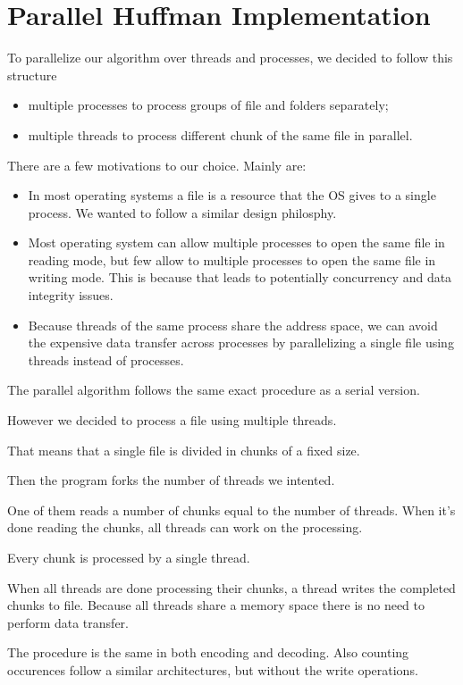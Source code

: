 \section{Parallel Huffman Implementation}
To parallelize our algorithm over threads and processes, we decided to follow this structure
\begin{itemize}
    \item multiple processes to process groups of file and folders separately;
    \item multiple threads to process different chunk of the same file in parallel.
\end{itemize}

There are a few motivations to our choice. Mainly are:

\begin{itemize}
	\item In most operating systems a file is a resource that the OS gives to a single process. We wanted to follow a similar design philosphy.
	\item Most operating system can allow multiple processes to open the same file in reading mode, but few allow to multiple processes to open the same file in writing mode. This is because that leads to potentially concurrency and data integrity issues.
	\item Because threads of the same process share the address space, we can avoid the expensive data transfer across processes by parallelizing a single file using threads instead of processes. 
\end{itemize}

The parallel algorithm follows the same exact procedure as a serial version.

However we decided to process a file using multiple threads.

That means that a single file is divided in chunks of a fixed size. 

Then the program forks the number of threads we intented.

One of them reads a number of chunks equal to the number of threads. When it's done reading the chunks, all threads can work on the processing.

Every chunk is processed by a single thread. 

When all threads are done processing their chunks, a thread writes the completed chunks to file. Because all threads share a memory space there is no need to perform data transfer.


The procedure is the same in both encoding and decoding. Also counting occurences follow a similar architectures, but without the write operations.





